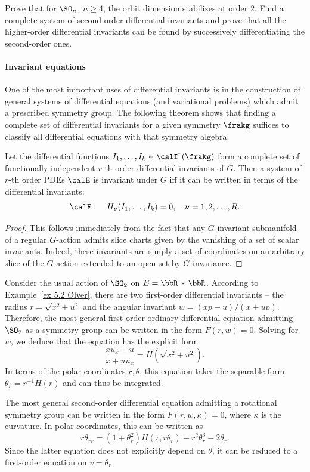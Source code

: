 \begin{xca}
    Prove that for $\SO_n$, $n\geq 4$, the orbit dimension stabilizes at order $2$. Find a complete system of second-order differential invariants and prove that all the higher-order differential invariants can be found by successively differentiating the second-order ones.
\end{xca}


\paragraph{Invariant equations} One of the most important uses of differential invariants is in the construction of general systems of differential equations (and variational problems) which admit a prescribed symmetry group. The following theorem shows that finding a complete set of differential invariants for a given symmetry $\frakg$ suffices to classify all differential equations with that symmetry algebra.

\begin{thm}
    Let the differential functions $I_1,\ldots,I_k\in\calI^r(\frakg)$ form a complete set of functionally independent $r$-th order differential invariants of $G$. Then a system of $r$-th order PDEs $\calE$ is invariant under $G$ iff it can be written in terms of the differential invariants:
    \[\calE:\quad H_\nu(I_1,\ldots,I_k)=0,\quad \nu=1,2,\ldots,R.\]
\end{thm}
\begin{proof}
    This follows immediately from the fact that any $G$-invariant submanifold of a regular $G$-action admits slice charts given by the vanishing of a set of scalar invariants. Indeed, these invariants are simply a set of coordinates on an arbitrary slice of the $G$-action extended to an open set by $G$-invariance.
\end{proof}
  

\begin{example}
    Consider the usual action of $\SO_2$ on $E=\bbR\times\bbR$. According to Example~\ref{ex 5.2 Olver}, there are two first-order differential invariants -- the radius $r=\sqrt{x^2+u^2}$ and the angular invariant $w=(xp-u)/(x+up)$. Therefore, the most general first-order ordinary differential equation admitting $\SO_2$ as a symmetry group can be written in the form $F(r,w)=0$. Solving for $w$, we deduce that the equation has the explicit form 
    \[\frac{xu_x-u}{x+uu_x}=H\left(\sqrt{x^2+u^2}\right).\]
    In terms of the polar coordinates $r,\theta$, this equation takes the separable form $\theta_r=r^{-1}H(r)$ and can thus be integrated.

    The most general second-order differential equation admitting a rotational symmetry group can be written in the form $F(r,w,\kappa)=0$, where $\kappa$ is the curvature. In polar coordinates, this can be written as 
    \[r\theta_{rr}=(1+\theta_r^2)H(r,r\theta_r)-r^2\theta_r^3-2\theta_r.\]
    Since the latter equation does not explicitly depend on $\theta$, it can be reduced to a first-order equation on $v=\theta_r$.
\end{example}

